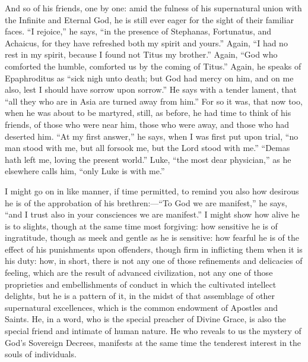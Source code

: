 And so of his friends, one by one: amid the fulness of
his supernatural union with the Infinite and Eternal God,
he is still ever eager for the sight of their familiar
faces. ``I rejoice,'' he says, ``in the
presence of Stephanas, Fortunatus, and Achaicus, for they
have refreshed both my spirit and yours.'' Again,
``I had no rest in my spirit, because I found not
Titus my brother.'' Again, ``God who comforted
the humble, comforted us by the coming of Titus.''
Again, he speaks of Epaphroditus as ``sick nigh unto
death; but God had mercy on him, and on me also, lest I
should have sorrow upon sorrow.'' He says with a
tender lament, that ``all they who are in Asia are
turned away from him.'' For so it was, that now too,
when he was about to be martyred, still, as before, he
had time to think of his friends, of those who were near
him, those who were away, and those who had deserted him. ``At my first answer,'' he says, when I was first
put upon trial, ``no man stood with me, but all
forsook me, but the Lord stood with me.'' ``Demas
hath left me, loving the present world.'' Luke,
``the most dear physician,'' as he elsewhere
calls him, ``only Luke is with me.''

I might go on in like manner, if time permitted, to
remind you also how desirous he is of the approbation of
his brethren:—``To God we are manifest,'' he
says, ``and I trust also in your consciences we are
manifest.'' I might show how alive he is to slights,
though at the same time most forgiving: how sensitive he
is of ingratitude, though as meek and gentle as he is
sensitive: how fearful he is of the effect of his
punishments upon offenders, though firm in inflicting
them when it is his duty: how, in short, there is not any
one of those refinements and delicacies of feeling, which
are the result of advanced civilization, not any one of
those proprieties and embellishments of conduct in which
the cultivated intellect delights, but he is a pattern of
it, in the midst of that assemblage of other supernatural
excellences, which is the common endowment of Apostles
and Saints. He, in a word, who is the special preacher of
Divine Grace, is also the special friend and intimate of
human nature. He who reveals to us the mystery of God's
Sovereign Decrees, manifests at the same time the
tenderest interest in the souls of individuals.


